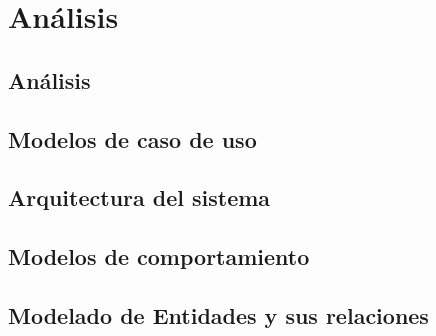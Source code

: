\chapter{Análisis} \label{chap:objetivosPlanificación}

\section{Análisis}


\section{Modelos de caso de uso}

\section{Arquitectura del sistema}

\section{Modelos de comportamiento}

\section{Modelado de Entidades y sus relaciones}